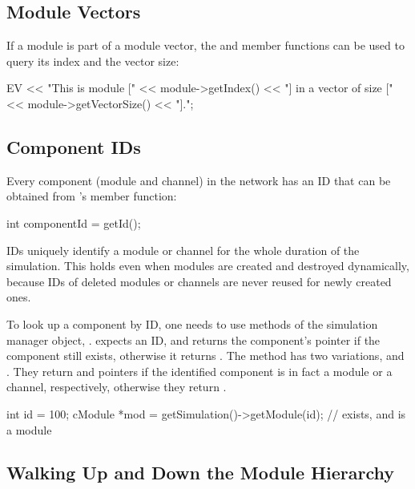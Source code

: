 \begin{ned}
\subsection{Module Vectors}
\label{sec:simple-modules:module-vectors}

If a module is part of a module vector, the
 and  member functions can be used to
query its index and the vector size:

\begin{cpp}
EV << "This is module [" << module->getIndex() <<
      "] in a vector of size [" << module->getVectorSize() << "].\n";
\end{cpp}


\subsection{Component IDs}
\label{sec:simple-modules:module-ids}

Every component (module and channel) in the network has an ID that
can be obtained from 's  member
function:

\begin{cpp}
int componentId = getId();
\end{cpp}

IDs uniquely identify a module or channel for the whole duration of the
simulation. This holds even when modules are created and destroyed
dynamically, because IDs of deleted modules or channels are never reused for
newly created ones.

To look up a component by ID, one needs to use methods of the simulation
manager object, .  expects an ID, and
returns the component's pointer if the component still exists, otherwise it
returns . The method has two variations, 
and . They return  and 
pointers if the identified component is in fact a module or a channel, respectively,
otherwise they return .

\begin{cpp}
int id = 100;
cModule *mod = getSimulation()->getModule(id); // exists, and is a module
\end{cpp}


\subsection{Walking Up and Down the Module Hierarchy}
\label{sec:simple-modules:walking-up-and-down-module-hierarchy}


\end{ned}
